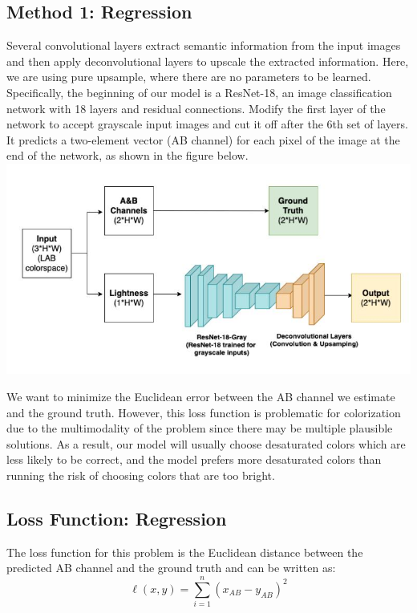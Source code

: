 \documentclass{article}
\begin{document}
\subsection{Method 1: Regression}
Several convolutional layers extract semantic information from the input images and then apply deconvolutional layers to upscale the extracted information.
Here, we are using pure upsample, where there are no parameters to be learned.
Specifically, the beginning of our model is a ResNet-18, an image classification network with 18 layers and residual connections. 
Modify the first layer of the network to accept grayscale input images and cut it off after the 6th set of layers. 
It predicts a two-element vector (AB channel) for each pixel of the image at the end of the network, as shown in the figure below.
\\
\includegraphics[width=\linewidth]{reg.jpg}

We want to minimize the Euclidean error between the AB channel we estimate and the ground truth.
However, this loss function is problematic for colorization due to the multimodality of the problem since there may be multiple plausible solutions.
As a result, our model will usually choose desaturated colors which are less likely to be correct, and the model prefers more desaturated colors than running the risk of choosing colors that are too bright.


\subsection{Loss Function: Regression}
The loss function for this problem is the Euclidean distance between the predicted AB channel and the ground truth and can be written as:
{\Large
\begin{equation}
    \ell(x,y) = \sum_{i=1}^{n} \left( x_{AB} - y_{AB} \right)^2
\end{equation}}
\end{document}
